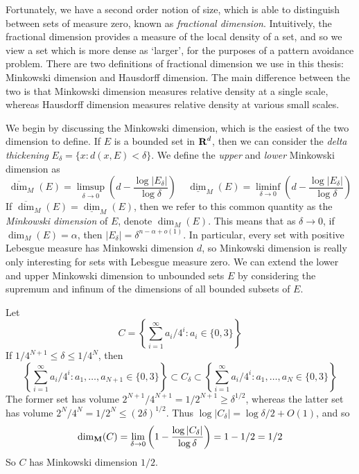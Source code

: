 Fortunately, we have a second order notion of size, which is able to distinguish between sets of measure zero, known as {\it fractional dimension}.  Intuitively, the fractional dimension provides a measure of the local density of a set, and so we view a set which is more dense as `larger', for the purposes of a pattern avoidance problem. There are two definitions of fractional dimension we use in this thesis: Minkowski dimension and Hausdorff dimension. The main difference between the two is that Minkowski dimension measures relative density at a single scale, whereas Hausdorff dimension measures relative density at various small scales.

We begin by discussing the Minkowski dimension, which is the easiest of the two dimension to define. If $E$ is a bounded set in $\operatorname{\mathbf{R}}^d$, then we can consider the {\it delta thickening} $E_\delta = \{ x: d(x,E) < \delta \}$. We define the {\it upper} and {\it lower} Minkowski dimension as
%
\[ \overline{\dim}_M(E) = \limsup_{\delta \to 0} \left( d - \frac{\log|E_\delta|}{\log \delta} \right)\ \ \ \ \ \underline{\dim}_M(E) = \liminf_{\delta \to 0} \left( d - \frac{\log|E_\delta|}{\log \delta} \right) \]
%
If $\overline{\dim}_M(E) = \underline{\dim}_M(E)$, then we refer to this common quantity as the {\it Minkowski dimension} of $E$, denote $\dim_M(E)$. This means that as $\delta \to 0$, if $\dim_M(E) = \alpha$, then $|E_\delta| = \delta^{n - \alpha + o(1)}$. In particular, every set with positive Lebesgue measure has Minkowski dimension $d$, so Minkowski dimension is really only interesting for sets with Lebesgue measure zero. We can extend the lower and upper Minkowski dimension to unbounded sets $E$ by considering the supremum and infinum of the dimensions of all bounded subsets of $E$.


\begin{example}
	Let
	\[ C = \left\{ \sum_{i = 1}^\infty a_i/4^i : a_i \in \{ 0, 3 \} \right\} \]
	If $1/4^{N+1} \leq \delta \leq 1/4^N$, then
	\[ \left\{ \sum_{i = 1}^\infty a_i/4^i : a_1, \dots, a_{N+1} \in \{ 0, 3 \} \right\} \subset C_\delta \subset \left\{ \sum_{i = 1}^\infty a_i/4^i : a_1, \dots, a_N \in \{ 0, 3 \} \right\} \]
	The former set has volume $2^{N+1}/4^{N+1} = 1/2^{N+1} \geq \delta^{1/2}$, whereas the latter set has volume $2^N/4^N = 1/2^N \leq (2\delta)^{1/2}$. Thus $\log |C_\delta| = \log \delta/ 2 + O(1)$, and so
	\[ \operatorname{\dim_{\mathbf{M}}}(C) = \lim_{\delta \to 0} \left( 1 - \frac{\log |C_\delta|}{\log \delta} \right) = 1 - 1/2 = 1/2 \]
	So $C$ has Minkowski dimension $1/2$.
\end{example}

